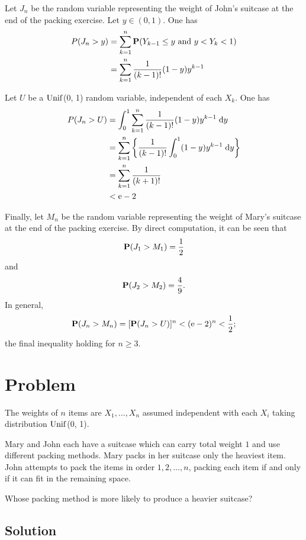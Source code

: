 \documentclass[british,a4paper]{article}
\begin{document}
Let \(J_n\) be the random variable representing the weight of John's suitcase at the end of the packing exercise. Let \(y \in (0, 1)\). One has
\begin{equation*}
    \begin{split}
        P(J_n > y) &= \sum_{k = 1}^n \operatorname{\mathbf{P}}(Y_{k - 1} \leq y \text{ and } y < Y_k < 1)\\
        &= \sum_{k = 1}^n \frac{1}{(k - 1)!}(1- y)y^{k - 1}
    \end{split}
\end{equation*}

Let \(U\) be a \(\operatorname{Unif}\)(0, 1) random variable, independent of each \(X_k\). One has
\begin{equation*}
    \begin{split}
        P(J_n > U) &= \int_0^1 \sum_{k = 1}^n \frac{1}{(k - 1)!}(1- y)y^{k - 1} \;\mathrm{d} y\\
        &= \sum_{k = 1}^n \left\{ \frac{1}{(k - 1)!}\int_0^1 (1- y)y^{k - 1} \;\mathrm{d} y\right\}\\
        &= \sum_{k = 1}^n \frac{1}{(k + 1)!}\\
        &< \mathrm{e} - 2
    \end{split}
\end{equation*}

Finally, let \(M_n\) be the random variable representing the weight of Mary's suitcase at the end of the packing exercise. By direct computation, it can be seen that
\[
\operatorname{\mathbf{P}}(J_1 > M_1) = \frac{1}{2}
\]
and
\[
\operatorname{\mathbf{P}}(J_2 > M_2) = \frac{4}{9}\text{.}
\]
In general,
\[
\operatorname{\mathbf{P}}(J_n > M_n) = [\operatorname{\mathbf{P}}(J_n > U)]^n < (\mathrm{e} - 2)^n < \frac{1}{2}\text{;}
\]
the final inequality holding for \(n \geq 3\). 

\section{Problem}
The weights of \(n\) items are \(X_1, \dotsc, X_n\) assumed independent with each \(X_i\) taking distribution \(\operatorname{Unif}\)(0, 1).

Mary and John each have a suitcase which can carry total weight \(1\) and use different packing methods. Mary packs in her suitcase only the heaviest item. John attempts to pack the items in order \(1, 2, \dotsc, n\), packing each item if and only if it can fit in the remaining space.

Whose packing method is more likely to produce a heavier suitcase?

\subsection*{Solution}
\end{document}
